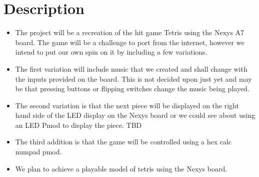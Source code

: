 \section{Description}
    \begin{itemize}
        \item The project will be a recreation of the hit game Tetris using the Nexys A7 board. The game will be a challenge to port from the internet, however we intend to put our own spin on it by including a few variations.
        \item The first variation will include music that we created and shall change with the inputs provided on the board. This is not decided upon just yet and may be that pressing buttons or flipping switches change the music being played.
        \item The second variation is that the next piece will be displayed on the right hand side of the LED display on the Nexys board or we could see about using an LED Pmod to display the piece. TBD
        \item The third addition is that the game will be controlled using a hex calc numpad pmod.
        \item We plan to achieve a playable model of tetris using the Nexys board.
    \end{itemize}
